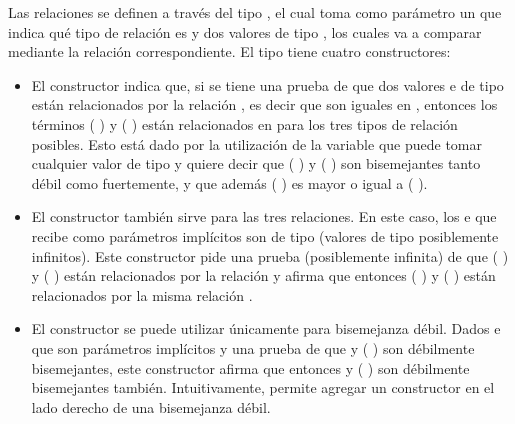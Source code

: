 Las relaciones se definen a través del tipo , el cual toma como parámetro un  que indica qué tipo de relación es y dos valores de tipo  \AgdaDatatype{$\bot$}, los cuales va a comparar mediante la relación correspondiente. El tipo  tiene cuatro constructores:
\begin{itemize}[noitemsep]
\item El constructor  indica que, si se tiene una prueba de que dos valores  e  de tipo  están relacionados por la relación \AgdaBound{$\sim$}, es decir que son iguales en , entonces los términos ( ) y ( ) están relacionados en  \AgdaDatatype{$\bot$} para los tres tipos de relación posibles. Esto está dado por la utilización de la variable  que puede tomar cualquier valor de tipo  y quiere decir que ( ) y ( ) son bisemejantes tanto débil como fuertemente, y que además ( ) es mayor o igual a ( ).

\item El constructor  también sirve para las tres relaciones. En este caso, los  e  que recibe como parámetros implícitos son de tipo \AgdaFunction{$\infty$}  \AgdaDatatype{$\bot$} (valores de tipo  \AgdaDatatype{$\bot$} posiblemente infinitos). Este constructor pide una prueba (posiblemente infinita) de que (\AgdaField{$\flat$} ) y (\AgdaField{$\flat$} ) están relacionados por la relación  y afirma que entonces ( ) y ( ) están relacionados por la misma relación .

\item El constructor  se puede utilizar únicamente para bisemejanza débil. Dados  \AgdaSymbol{:}  \AgdaDatatype{$\bot$} e  \AgdaSymbol{:} \AgdaFunction{$\infty$}  \AgdaDatatype{$\bot$} que son parámetros implícitos y una prueba de que  y (\AgdaField{$\flat$} ) son débilmente bisemejantes, este constructor afirma que entonces  y ( ) son débilmente bisemejantes también. Intuitivamente,  permite agregar un constructor  en el lado derecho de una bisemejanza débil.


\end{itemize}
